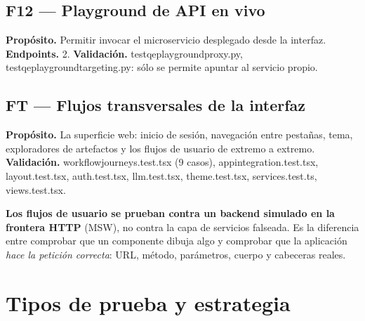 \documentclass[11pt,a4paper]{article}
\newcommand{\code}[1]{{\ttfamily\small\def\_{\textunderscore\allowbreak}#1}}
\begin{document}
\subsection{F12 --- Playground de API en vivo}

\begin{finding}
\textbf{Propósito.} Permitir invocar el microservicio desplegado desde la interfaz.
\textbf{Endpoints.} 2. \textbf{Validación.} \code{test\_qe\_playground\_proxy.py},
\code{test\_qe\_playground\_targeting.py}: sólo se permite apuntar al servicio propio.
\end{finding}

\subsection{FT --- Flujos transversales de la interfaz}

\begin{finding}
\textbf{Propósito.} La superficie web: inicio de sesión, navegación entre pestañas, tema,
exploradores de artefactos y los flujos de usuario de extremo a extremo.
\textbf{Validación.} \code{workflow\_journeys.test.tsx} (9 casos),
\code{app\_integration.test.tsx}, \code{layout.test.tsx}, \code{auth.test.tsx},
\code{llm.test.tsx}, \code{theme.test.tsx}, \code{services.test.ts},
\code{views\_*.test.tsx}.
\end{finding}

\noindent\textbf{Los flujos de usuario se prueban contra un backend simulado en la frontera
HTTP} (MSW), no contra la capa de servicios falseada. Es la diferencia entre comprobar que un
componente dibuja algo y comprobar que la aplicación \emph{hace la petición correcta}: URL,
método, parámetros, cuerpo y cabeceras reales.

\section{Tipos de prueba y estrategia}
\label{sec:tipos}
\end{document}
